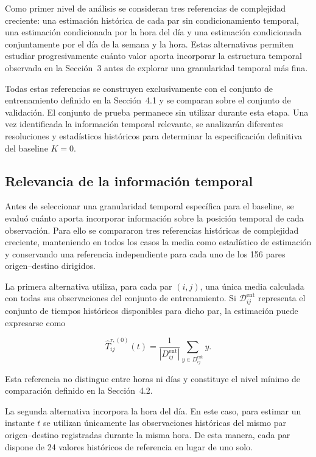 \documentclass[11pt]{article}
\begin{document}
Como primer nivel de análisis se consideran tres referencias de complejidad creciente: una estimación histórica de cada par sin condicionamiento temporal, una estimación condicionada por la hora del día y una estimación condicionada conjuntamente por el día de la semana y la hora. Estas alternativas permiten estudiar progresivamente cuánto valor aporta incorporar la estructura temporal observada en la Sección~3 antes de explorar una granularidad temporal más fina.

Todas estas referencias se construyen exclusivamente con el conjunto de entrenamiento definido en la Sección~4.1 y se comparan sobre el conjunto de validación. El conjunto de prueba permanece sin utilizar durante esta etapa. Una vez identificada la información temporal relevante, se analizarán diferentes resoluciones y estadísticos históricos para determinar la especificación definitiva del baseline $K=0$.

\subsection{Relevancia de la información temporal}

Antes de seleccionar una granularidad temporal específica para el baseline, se evaluó cuánto aporta incorporar información sobre la posición temporal de cada observación. Para ello se compararon tres referencias históricas de complejidad creciente, manteniendo en todos los casos la media como estadístico de estimación y conservando una referencia independiente para cada uno de los 156 pares origen--destino dirigidos.

La primera alternativa utiliza, para cada par $(i,j)$, una única media calculada con todas sus observaciones del conjunto de entrenamiento. Si $\mathcal{D}_{ij}^{\mathrm{ent}}$ representa el conjunto de tiempos históricos disponibles para dicho par, la estimación puede expresarse como

\[
\widehat{T}^{\tau,(0)}_{ij}(t)
=
\frac{1}{\left|D^{\mathrm{ent}}_{ij}\right|}
\sum_{y\in D^{\mathrm{ent}}_{ij}} y.
\]

Esta referencia no distingue entre horas ni días y constituye el nivel mínimo de comparación definido en la Sección~4.2.

La segunda alternativa incorpora la hora del día. En este caso, para estimar un instante $t$ se utilizan únicamente las observaciones históricas del mismo par origen--destino registradas durante la misma hora. De esta manera, cada par dispone de 24 valores históricos de referencia en lugar de uno solo.
\end{document}
